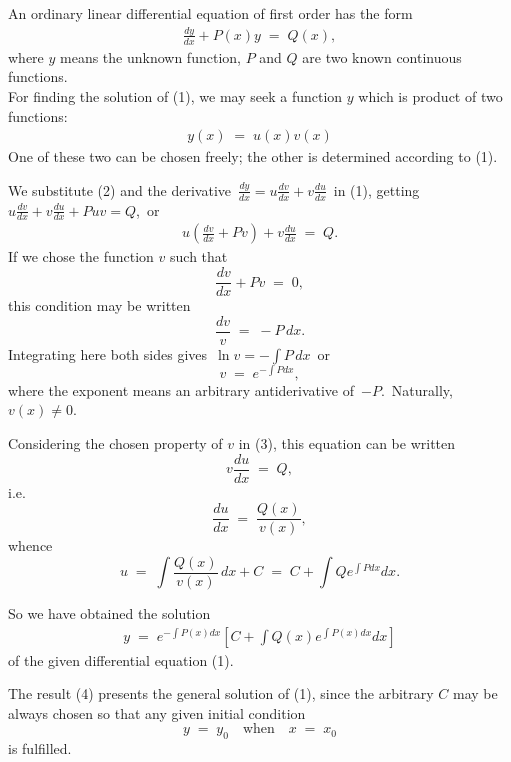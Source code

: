 \documentclass[12pt]{article}
\theoremstyle{definition}
\begin{document}
An ordinary linear differential equation of first order has the form
\begin{align}
  \frac{dy}{dx}+P(x)y \;=\; Q(x),
\end{align}
where $y$ means the unknown function, $P$ and $Q$ are two known continuous functions.\\

For finding the solution of (1), we may seek a function $y$ which is product of two functions:
\begin{align}
  y(x) \;=\; u(x)v(x)
\end{align}
One of these two can be chosen freely; the other is determined according to (1).

We substitute (2) and the derivative \,$\frac{dy}{dx} = u\frac{dv}{dx}+v\frac{du}{dx}$\, in (1), getting\, 
$u\frac{dv}{dx}+v\frac{du}{dx}+Puv = Q$,\, or
\begin{align}
  u\left(\frac{dv}{dx}+Pv\right)+v\frac{du}{dx} \;=\; Q.
\end{align}
If we chose the function $v$ such that
$$\frac{dv}{dx}+Pv \;=\; 0,$$
this condition may be written
$$\frac{dv}{v} \;=\; -P\,dx.$$
Integrating here both sides gives\, $\ln{v} = -\int P\,dx$\, or
$$v \;=\; e^{-\int Pdx},$$
where the exponent means an arbitrary antiderivative of\, $-P$.\, Naturally, $v(x) \neq 0$.\,

Considering the chosen property of $v$ in (3), this equation can be written
$$v\frac{du}{dx} \;=\; Q,$$
i.e. 
$$\frac{du}{dx} \;=\; \frac{Q(x)}{v(x)},$$
whence
$$u \;=\; \int\frac{Q(x)}{v(x)}\,dx+C \;=\; C+\!\int Qe^{\int Pdx}dx.$$

So we have obtained the solution
\begin{align}
  y \;=\; e^{-\int P(x)dx}\left[C+\!\int Q(x)e^{\int P(x)dx}dx\right]
\end{align}
of the given differential equation (1).

The result (4) presents the general solution of (1), since the arbitrary  $C$ may be always chosen so that any given initial condition
$$y \;=\; y_0 \quad \mathrm{when}\quad x \;=\; x_0$$
is fulfilled.

\end{document}
